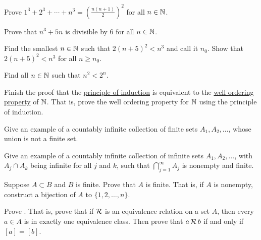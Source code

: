 \begin{exercise}
Prove $1^3 + 2^3 + \cdots + n^3 = {\left( \frac{n(n+1)}{2} \right)}^2$
for all $n \in {\mathbb{N}}$.
\end{exercise}

\begin{exercise}
Prove that $n^3 + 5n$ is divisible by $6$ for all $n \in {\mathbb{N}}$.
\end{exercise}

\begin{exercise}
Find the smallest $n \in {\mathbb{N}}$ such that $2{(n+5)}^2 < n^3$ and call it $n_0$.
Show that $2{(n+5)}^2 < n^3$ for all $n \geq n_0$.
\end{exercise}

\begin{exercise}
Find all $n \in {\mathbb{N}}$ such that $n^2 < 2^n$.
\end{exercise}

\begin{exercise}
Finish the proof that the \hyperref[induction:thm]{principle of induction}
is equivalent to the
\hyperlink{wop:link}{well ordering property} of ${\mathbb{N}}$.  That is,
prove the well ordering property for ${\mathbb{N}}$ using the principle of
induction.
\end{exercise}


\begin{exercise}
Give an example of a countably infinite collection of finite sets $A_1, A_2, \ldots$,
whose union is not a finite set.
\end{exercise}

\begin{exercise}
Give an example of a countably infinite collection of infinite sets $A_1, A_2, \ldots$,
with $A_j \cap A_k$ being infinite for all $j$ and $k$, such that
$\bigcap_{j=1}^\infty A_j$
is nonempty and finite.
\end{exercise}

\begin{exercise}
Suppose $A \subset B$ and $B$ is finite. Prove that $A$ is finite.
That is, if $A$ is nonempty, construct a bijection of $A$ to $\{ 1,2,\ldots,n \}$.
\end{exercise}

\begin{exercise}
Prove .  That is, prove that if ${\mathcal{R}}$ is an
equivalence relation on a set $A$, then every $a \in A$ is in exactly one
equivalence class.  Then prove that $a \, {\mathcal{R}} \, b$ if and only if $[a] =
[b]$.
\end{exercise}

